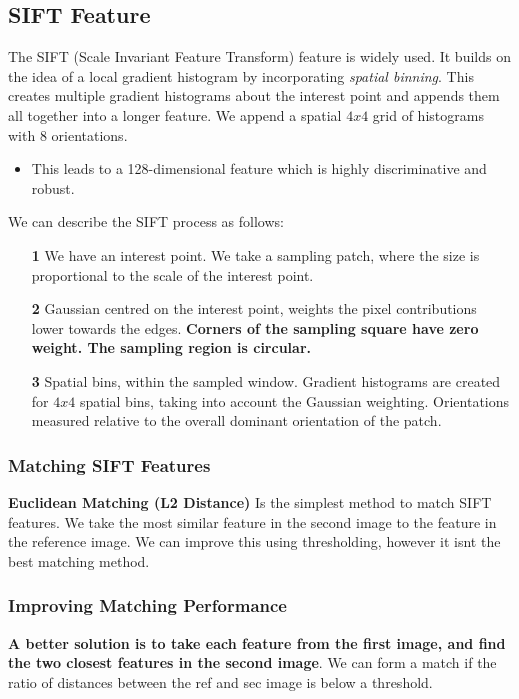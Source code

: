 \subsection{SIFT Feature}

The SIFT (Scale Invariant Feature Transform) feature is widely used. It builds on the idea of a local gradient histogram by incorporating \textit{spatial binning}. This creates multiple gradient histograms about the interest point and appends them all together into a longer feature. We append a spatial $4x4$ grid of histograms with 8 orientations.
\begin{itemize}
    \itemsep0em
    \item This leads to a 128-dimensional feature which is highly discriminative and robust.
\end{itemize}

We can describe the SIFT process as follows:

\begin{itemize}
    \itemsep0em
    \item [\textbf{1}] We have an interest point. We take a sampling patch, where the size is proportional to the scale of the interest point.
    \item [\textbf{2}] Gaussian centred on the interest point, weights the pixel contributions lower towards the edges. \textbf{Corners of the sampling square have zero weight. The sampling region is circular.}
    \item [\textbf{3}] Spatial bins, within the sampled window. Gradient histograms are created for $4x4$ spatial bins, taking into account the Gaussian weighting. Orientations measured relative to the overall dominant orientation of the patch.
\end{itemize}

\subsubsection{Matching SIFT Features}

\textbf{Euclidean Matching (L2 Distance)}  Is the simplest method to match SIFT features. We take the most similar feature in the second image to the feature in the reference image. We can improve this using thresholding, however it isnt the best matching method.

\subsubsection{Improving Matching Performance}

\textbf{A better solution is to take each feature from the first image, and find the two closest features in the second image}. We can form a match if the ratio of distances between the ref and sec image is below a threshold.